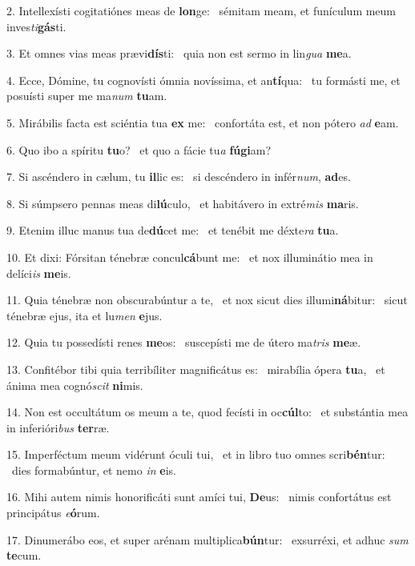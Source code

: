 2. Intellexísti cogitatiónes meas de \textbf{lon}ge: \ast\  sémitam meam, et funículum meum inves\textit{ti}\textbf{gás}ti.\

3. Et omnes vias meas prævi\textbf{dís}ti: \ast\  quia non est sermo in lin\textit{gua} \textbf{me}a.\

4. Ecce, Dómine, tu cognovísti ómnia novíssima, et an\textbf{tí}qua: \ast\  tu formásti me, et posuísti super me ma\textit{num} \textbf{tu}am.\

5. Mirábilis facta est sciéntia tua \textbf{ex} me: \ast\  confortáta est, et non pótero \textit{ad} \textbf{e}am.\

6. Quo ibo a spíritu \textbf{tu}o? \ast\  et quo a fácie tu\textit{a} \textbf{fú}\textbf{gi}am?\

7. Si ascéndero in cælum, tu \textbf{il}lic es: \ast\  si descéndero in infér\textit{num}, \textbf{ad}es.\

8. Si súmpsero pennas meas di\textbf{lú}culo, \ast\  et habitávero in extré\textit{mis} \textbf{ma}ris.\

9. Etenim illuc manus tua de\textbf{dú}cet me: \ast\  et tenébit me déxte\textit{ra} \textbf{tu}a.\

10. Et dixi: Fórsitan ténebræ concul\textbf{cá}bunt me: \ast\  et nox illuminátio mea in delíci\textit{is} \textbf{me}is.\

11. Quia ténebræ non obscurabúntur a te, \dag\  et nox sicut dies illumi\textbf{ná}bitur: \ast\  sicut ténebræ ejus, ita et lu\textit{men} \textbf{e}jus.\

12. Quia tu possedísti renes \textbf{me}os: \ast\  suscepísti me de útero ma\textit{tris} \textbf{me}æ.\

13. Confitébor tibi quia terribíliter magnificátus es: \dag\  mirabília ópera \textbf{tu}a, \ast\  et ánima mea cognó\textit{scit} \textbf{ni}mis.\

14. Non est occultátum os meum a te, quod fecísti in oc\textbf{cúl}to: \ast\  et substántia mea in inferióri\textit{bus} \textbf{ter}ræ.\

15. Imperféctum meum vidérunt óculi tui, \dag\  et in libro tuo omnes scri\textbf{bén}tur: \ast\  dies formabúntur, et nemo \textit{in} \textbf{e}is.\

16. Mihi autem nimis honorificáti sunt amíci tui, \textbf{De}us: \ast\  nimis confortátus est principátus \textit{e}\textbf{ó}rum.\

17. Dinumerábo eos, et super arénam multiplica\textbf{bún}tur: \ast\  exsurréxi, et adhuc \textit{sum} \textbf{te}cum.\

